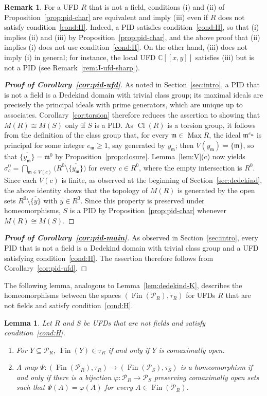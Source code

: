 \documentclass[12pt,reqno,a4paper]{amsart}
\newcommand{\C}{\mathbb{C}}
\newcommand{\Pe}{\mathcal{P}}
\newcommand{\m}{\mathfrak{m}}
\newcommand{\clo}[1]{\overline{\{#1\}}}
\newcommand{\pow}[1]{[\![#1]\!]}
\DeclareMathOperator{\Max}{Max}
\DeclareMathOperator{\Fin}{Fin}
\DeclareMathOperator{\Cl}{Cl}
\theoremstyle{plain}
\newtheorem{lemma}[theorem]{Lemma}
\theoremstyle{definition}
\newtheorem{remark}[theorem]{Remark}
\begin{document}
\begin{remark}\label{rem:pid-char-H}
For a UFD $R$ that is not a field, conditions (i) and (ii) of Proposition~\ref{prop:pid-char} are equivalent and imply (iii) even if $R$ does not satisfy condition~\ref{cond:H}. Indeed, a PID satisfies condition~\ref{cond:H}, so that (i) implies (ii) and (iii) by Proposition~\ref{prop:pid-char}, and the above proof that (ii) implies (i) does not use condition~\ref{cond:H}. On the other hand, (iii) does not imply (i) in general; for instance, the local UFD $\C\pow{x,y}$ satisfies (iii) but is not a PID (see Remark~\ref{rem:J-ufd-sharp}).
\end{remark}
\begin{proof}[\normalfont\bfseries Proof of Corollary~\ref{cor:pid-ufd}]
As noted in Section~\ref{sec:intro}, a PID that is not a field is a Dedekind domain with trivial class group; its maximal ideals are precisely the principal ideals with prime generators, which are unique up to associates. Corollary~\ref{cor:torsion} therefore reduces the assertion to showing that $M(R)\cong M(S)$ only if $S$ is a PID. As $\Cl(R)$ is a torsion group, it follows from the definition of the class group that, for every $\m\in\Max R$, the ideal $\m^{e_\m}$ is principal for some integer $e_\m\geq1$, say generated by $y_\m$; then $V(y_\m)=\{\m\}$, so that $\clo{y_\m}=\m^0$ by Proposition~\ref{prop:closure}.
Lemma~\ref{lem:V}(c) now yields $\sigma_c^0=\bigcap\limits_{\m\in V(c)}\bigl(R^0\setminus\clo{y_\m}\bigr)$ for every $c\in R^0$, where the empty intersection is $R^0$. Since each $V(c)$ is finite, as observed at the beginning of Section~\ref{sec:dedekind}, the above identity shows that the topology of $M(R)$ is generated by the open sets $R^0\setminus\clo{y}$ with $y\in R^0$. Since this property is preserved under homeomorphisms, $S$ is a PID by Proposition~\ref{prop:pid-char} whenever $M(R)\cong M(S)$.
\end{proof}
\begin{proof}[\normalfont\bfseries Proof of Corollary~\ref{cor:pid-main}]
As observed in Section~\ref{sec:intro}, every PID that is not a field is a Dedekind domain with trivial class group and a UFD satisfying condition~\ref{cond:H}. The assertion therefore follows from Corollary~\ref{cor:pid-ufd}.
\end{proof}
The following lemma, analogous to Lemma~\ref{lem:dedekind-K}, describes the homeomorphisms between the spaces $(\Fin(\Pe_R),\tau_R)$ for UFDs $R$ that are not fields and satisfy condition~\ref{cond:H}.
\begin{lemma}\label{lem:fin-homeo}
Let $R$ and $S$ be UFDs that are not fields and satisfy condition~\ref{cond:H}.
\begin{enumerate}[label=\textup{(\alph*)}]
\item For $Y\subseteq\Pe_R$, $\Fin(Y)\in\tau_R$ if and only if $Y$ is comaximally open.
\item A map $\Psi\colon(\Fin(\Pe_R),\tau_R)\to(\Fin(\Pe_S),\tau_S)$ is a homeomorphism if and only if there is a bijection $\varphi\colon\Pe_R\to\Pe_S$ preserving comaximally open sets such that $\Psi(A)=\varphi(A)$ for every $A\in\Fin(\Pe_R)$.
\end{enumerate}
\end{lemma}
\end{document}
